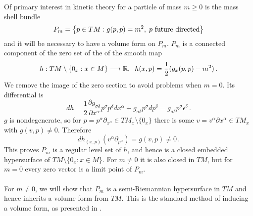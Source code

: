 Of primary interest in kinetic theory for a particle of mass $m\geq 0$ is the mass shell bundle
\begin{equation}
P_m=\left\{p\in TM :g(p,p)=m^2,\hspace{1mm} p\text{ future directed}\right\}
\end{equation}
and it will be necessary to have a volume form on $P_m$. $P_m$ is a connected component of the zero set of the of the smooth map 
\begin{equation}\label{definingFunction}
h:TM\setminus \{0_x:x\in M\}\longrightarrow \mathbb{R},\hspace{2mm} h(x,p)= \frac{1}{2}(g_x(p,p)-m^2)\,. 
\end{equation} 
We remove the image of the zero section to avoid problems when $m=0$. Its differential is
\begin{equation}\label{dh}
dh=\frac{1}{2}\frac{\partial g_{\sigma\delta}}{\partial x^\alpha}p^\sigma p^\delta dx^\alpha+g_{\sigma\delta}p^\sigma dp^\delta=g_{\sigma\delta}p^\sigma\epsilon^\delta\,.
\end{equation}
$g$ is nondegenerate, so for $p=p^{\alpha}\partial_{x^\alpha}\in TM_x\setminus{\{0_x\}}$ there is some $v=v^\alpha\partial{x^\alpha}\in TM_x$ with $g(v,p)\neq 0$. Therefore
\begin{equation}
dh_{(x,p)}(v^\alpha\partial_{p^\alpha})=g(v,p)\neq 0\,.
\end{equation}
This proves $P_m$ is a regular level set of $h$, and hence is a closed embedded hypersurface of $TM\setminus \{0_x:x\in M\}$. For $m\neq 0$ it is also closed in $TM$, but for $m=0$ every zero vector is a limit point of $P_m$.\\

\\
For $m\neq 0$, we will show that $P_m$ is a semi-Riemannian hypersurface in $TM$ and hence inherits a volume form from $TM$. This is the standard method of inducing a volume form, as presented in \cite{tsamparlis}. 

